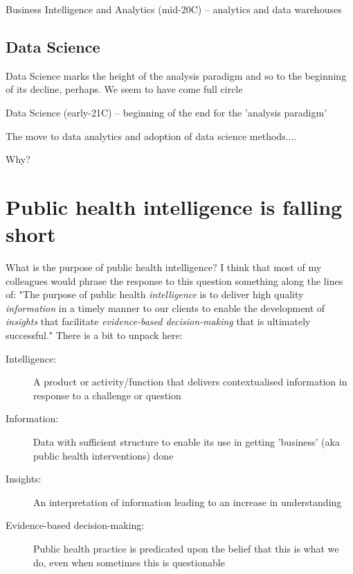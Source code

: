 Business Intelligence and Analytics (mid-20C) -- analytics and data warehouses


\subsection*{Data Science} 
Data Science marks the height of the analysis paradigm and so to the beginning of its decline, perhaps. We seem to have come full circle 

Data Science (early-21C) -- beginning of the end for the 'analysis paradigm'



The move to data analytics and adoption of data science methods....

Why?

\section*{Public health intelligence is falling short}

What is the purpose of public health intelligence? I think that most of my colleagues would phrase the response to this question something along the lines of: "The purpose of public health \emph{intelligence} is to deliver high quality \emph{information} in a timely manner to our clients to enable the development of \emph{insights} that facilitate \emph{evidence-based decision-making} that is ultimately successful." There is a bit to unpack here:

\begin{description}
	\item[Intelligence:] A product or activity/function that delivers contextualised information in response to a challenge or question
	\item[Information:] Data with sufficient structure to enable its use in getting 'business' (aka public health interventions) done
	\item[Insights:] An interpretation of information leading to an increase in understanding
	\item[Evidence-based decision-making:] Public health practice is predicated upon the belief that this is what we do, even when sometimes this is questionable
\end{description}

